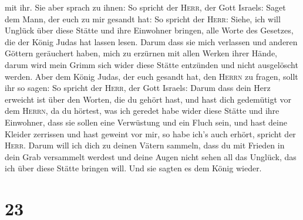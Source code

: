 mit ihr.  Sie aber sprach zu ihnen: So spricht der
\textsc{Herr}, der Gott Israels: Saget dem Mann, der euch zu mir gesandt
hat:  So spricht der \textsc{Herr}: Siehe, ich will
Unglück über diese Stätte und ihre Einwohner bringen, alle Worte des
Gesetzes, die der König Judas hat lassen lesen.  Darum
dass sie mich verlassen und anderen Göttern geräuchert haben, mich zu
erzürnen mit allen Werken ihrer Hände, darum wird mein Grimm sich wider
diese Stätte entzünden und nicht ausgelöscht werden. 
Aber dem König Judas, der euch gesandt hat, den \textsc{Herrn} zu
fragen, sollt ihr so sagen: So spricht der \textsc{Herr}, der Gott
Israels:  Darum dass dein Herz erweicht ist über den
Worten, die du gehört hast, und hast dich gedemütigt vor dem
\textsc{Herrn}, da du hörtest, was ich geredet habe wider diese Stätte
und ihre Einwohner, dass sie sollen eine Verwüstung und ein Fluch sein,
und hast deine Kleider zerrissen und hast geweint vor mir, so habe ich's
auch erhört, spricht der \textsc{Herr}.  Darum will ich
dich zu deinen Vätern sammeln, dass du mit Frieden in dein Grab
versammelt werdest und deine Augen nicht sehen all das Unglück, das ich
über diese Stätte bringen will. Und sie sagten es dem König wieder.

\hypertarget{section-22}{%
\section{23}\label{section-22}}

